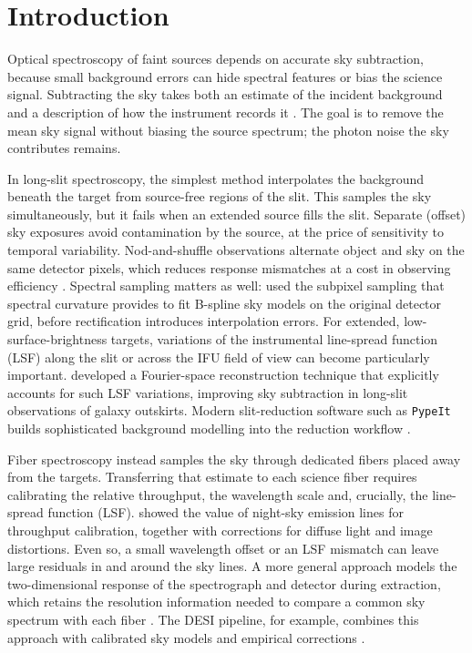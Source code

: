 % 
% 

\section{Introduction}
\label{sec:introduction}

Optical spectroscopy of faint sources depends on accurate sky subtraction,
because small background errors can hide spectral features or bias the
science signal. Subtracting the sky takes both an estimate of the incident
background and a description of how the instrument records it
\citep{Wyse1992}. The goal is to remove the mean sky signal without biasing
the source spectrum; the photon noise the sky contributes remains.

In long-slit spectroscopy, the simplest method interpolates the background
beneath the target from source-free regions of the slit. This samples the sky
simultaneously, but it fails when an extended source fills the slit.
Separate (offset) sky exposures avoid contamination by the source, at the
price of sensitivity to temporal variability. Nod-and-shuffle observations
alternate object and sky on the same detector pixels, which reduces response
mismatches at a cost in observing efficiency \citep{Glazebrook2001}.
Spectral sampling matters as well: \citet{Kelson2003} used the subpixel
sampling that spectral curvature provides to fit B-spline sky models on the
original detector grid, before rectification introduces interpolation
errors.
For extended, low-surface-brightness targets, variations of the instrumental line-spread function (LSF) along the slit or across the IFU field of view can become particularly important.
\citet{Katkov2011} developed a Fourier-space reconstruction technique that explicitly accounts for such LSF variations, improving sky subtraction in long-slit observations of galaxy outskirts.
Modern slit-reduction software such as \texttt{PypeIt} builds
sophisticated background modelling into the reduction workflow
\citep{Prochaska2020}.

Fiber spectroscopy instead samples the sky through dedicated fibers placed
away from the targets. Transferring that estimate to each science fiber
requires calibrating the relative throughput, the wavelength scale and,
crucially, the line-spread function (LSF). \citet{Lissandrini1994} showed
the value of night-sky emission lines for throughput calibration, together
with corrections for diffuse light and image distortions. Even so, a small
wavelength offset or an LSF mismatch can leave large residuals in and around
the sky lines. A more general approach models the two-dimensional response of
the spectrograph and detector during extraction, which retains the resolution
information needed to compare a common sky spectrum with each fiber
\citep{Bolton2010}. The DESI pipeline, for example, combines this approach
with calibrated sky models and empirical corrections \citep{Guy2023}.

